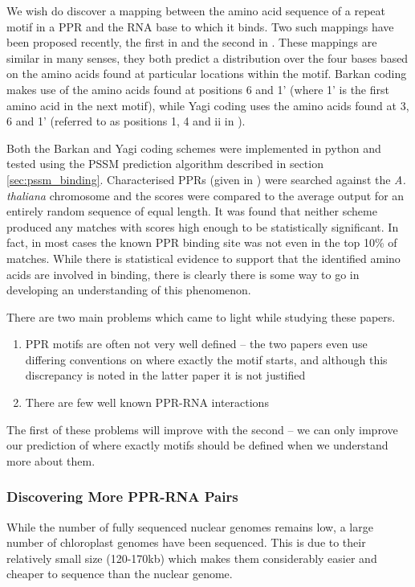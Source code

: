 We wish do discover a mapping between the amino acid sequence of a repeat
motif in a PPR and the RNA base to which it binds.
Two such mappings have been proposed recently, the first in \citet{Barkan2012}
and the second in \citet{Yagi2013}.
These mappings are similar in many senses, they both predict a distribution
over the four bases based on the amino acids found at particular locations
within the motif.
Barkan coding makes use of the amino acids found at positions 6 and 1' (where
1' is the first amino acid in the next motif), while Yagi coding uses the amino
acids found at 3, 6 and 1' (referred to as positions 1, 4 and ii in 
\citet{Yagi2013}).

Both the Barkan and Yagi coding schemes were implemented in python and tested
using the PSSM prediction algorithm described in section
\ref{sec:pssm_binding}.
Characterised PPRs (given in \citet{Yagi2013}) were searched against the
\emph{A. thaliana} chromosome and the scores were compared to the average 
output for an entirely random sequence of equal length.
It was found that neither scheme produced any matches with scores high enough 
to be statistically significant.
In fact, in most cases the known PPR binding site was not even in the top 10\%
of matches.
While there is statistical evidence to support that the identified amino acids
are involved in binding, there is clearly there is some way to go in developing 
an understanding of this phenomenon.

There are two main problems which came to light while studying these papers.
\begin{enumerate}
  \item PPR motifs are often not very well defined -- the two papers even use
    differing conventions on where exactly the motif starts, and although this
    discrepancy is noted in the latter paper it is not justified
  \item There are few well known PPR-RNA interactions
\end{enumerate}
The first of these problems will improve with the second -- we can only improve
our prediction of where exactly motifs should be defined when we understand
more about them.

\subsubsection{Discovering More PPR-RNA Pairs}

While the number of fully sequenced nuclear genomes remains low, a large 
number of chloroplast genomes have been sequenced.
This is due to their relatively small size (120-170kb) which makes them
considerably easier and cheaper to sequence than the nuclear genome.

